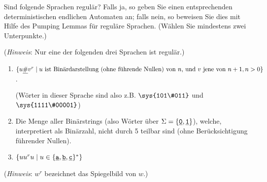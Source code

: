 \documentclass[10pt,a4paper]{scrartcl}
\newif\ifLoesung
\newcommand\Loesung[1]{\ifLoesung\begin{solution}#1\end{solution}\fi}
\newcommand{\ul}[1]{\underline{#1}} %
\newcommand\sy[1]{{\underline{\ifmmode\mathtt{#1}\else\texttt{#1}\fi}}} %
\begin{document}
\Loesung{
\begin{enumerate}
\item
Falsch. Da man nicht weiss was $L_2$ ist. Es koennte nicht regulaer sein. Somit wir durch $L_1 \cup L_2$ die daraus resultierende Sprache auch nicht regulaer.

\item
Falsch. Es ware entscheidbar unter der Annahme dass sowohl $L_1$ als auch $L_2$ entscheidbar waren.

\item
Falsch.

\item
Falsch, da ein unentscheidbares Problem auch keine entscheidbaren Probleme enthalten kann.

\item
Richtig, da eine regulare Sprache aus kleinsten Teilmengen von regularen Sprachen besteht.

\end{enumerate}

}
\begin{question} Sind folgende Sprachen regul\"ar? Falls ja, so geben Sie einen entsprechenden deterministischen 
endlichen Automaten an; falls nein, so beweisen Sie dies mit Hilfe des Pumping Lemmas f\"ur regul\"are Sprachen.
(W\"ahlen Sie mindestens zwei Unterpunkte.)

(\textit{Hinweis}: Nur eine der folgenden drei Sprachen ist regul\"ar.)
\begin{enumerate}

\item $\{u \sy \# v^r \mid u \mbox{ ist Bin\"ardarstellung (ohne f\"uhrende Nullen) von } n \mbox{, und } 
v \mbox{ jene von } n+1, n > 0 \} $. 

(W\"orter in dieser Sprache sind also z.B. $\sys{101\#011}$ und $\sys{1111\#00001}$)

\item Die Menge aller Bin\"arstrings (also W\"orter \"uber $\Sigma=\{\sy 0, \sy 1\}$), welche, interpretiert als Bin\"arzahl,
nicht durch 5 teilbar sind (ohne Ber\"ucksichtigung f\"uhrender Nullen).

\item $\{uu^ru  \mid u \in \{\sy a, \sy b, \sy c \}^*\}$
\end{enumerate}

(\textit{Hinweis}: $w^r$ bezeichnet das Spiegelbild von $w$.)

\end{question}
\end{document}
